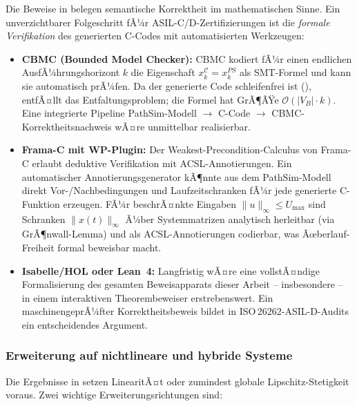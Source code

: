 ﻿\documentclass[12pt,a4paper]{article}
\theoremstyle{definition}
\begin{document}
Die Beweise in  belegen semantische Korrektheit im
mathematischen Sinne. Ein unverzichtbarer Folgeschritt fÃ¼r
ASIL-C/D-Zertifizierungen ist die \emph{formale Verifikation} des
generierten C-Codes mit automatisierten Werkzeugen:

\begin{itemize}
  \item \textbf{CBMC (Bounded Model Checker):} CBMC kodiert fÃ¼r einen
        endlichen AusfÃ¼hrungshorizont $k$ die Eigenschaft
        $x_k^\mathcal{C} = x_k^{PS}$ als SMT-Formel und kann sie
        automatisch prÃ¼fen. Da der generierte Code schleifenfrei ist
        (), entfÃ¤llt das Entfaltungsproblem; die Formel
        hat GrÃ¶ÃŸe $\mathcal{O}(|V_B| \cdot k)$. Eine integrierte
        Pipeline PathSim-Modell $\to$ C-Code $\to$ CBMC-Korrektheitsnachweis
        wÃ¤re unmittelbar realisierbar.

  \item \textbf{Frama-C mit WP-Plugin:} Der Weakest-Precondition-Calculus
        von Frama-C erlaubt deduktive Verifikation mit ACSL-Annotierungen.
        Ein automatischer Annotierungsgenerator kÃ¶nnte aus dem PathSim-Modell
        direkt Vor-/Nachbedingungen und Laufzeitschranken fÃ¼r jede generierte
        C-Funktion erzeugen. FÃ¼r beschrÃ¤nkte Eingaben
        $\|u\|_\infty \leq U_{\max}$ sind Schranken $\|x(t)\|_\infty$
        Ã¼ber Systemmatrizen analytisch herleitbar (via GrÃ¶nwall-Lemma) und
        als ACSL-Annotierungen codierbar, was Ãœberlauf-Freiheit formal
        beweisbar macht.

  \item \textbf{Isabelle/HOL oder Lean~4:} Langfristig wÃ¤re eine
        vollstÃ¤ndige Formalisierung des gesamten Beweisapparats dieser
        Arbeit -- insbesondere
         -- in
        einem interaktiven Theorembeweiser erstrebenswert. Ein
        maschinengeprÃ¼fter Korrektheitsbeweis bildet in
        ISO\,26262-ASIL-D-Audits ein entscheidendes Argument.
\end{itemize}

\subsubsection{Erweiterung auf nichtlineare und hybride Systeme}

Die Ergebnisse in  setzen LinearitÃ¤t oder
zumindest globale Lipschitz-Stetigkeit voraus. Zwei wichtige
Erweiterungsrichtungen sind:
\end{document}
